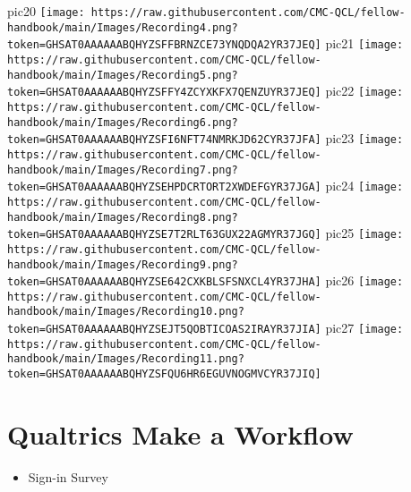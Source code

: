 \documentclass[
]{book}
\providecommand{\tightlist}{%
  \setlength{\itemsep}{0pt}\setlength{\parskip}{0pt}}
\begin{document}
pic20
\texttt{[image: https://raw.githubusercontent.com/CMC-QCL/fellow-handbook/main/Images/Recording4.png?token=GHSAT0AAAAAABQHYZSFFBRNZCE73YNQDQA2YR37JEQ]}
pic21
\texttt{[image: https://raw.githubusercontent.com/CMC-QCL/fellow-handbook/main/Images/Recording5.png?token=GHSAT0AAAAAABQHYZSFFY4ZCYXKFX7QENZUYR37JEQ]}
pic22
\texttt{[image: https://raw.githubusercontent.com/CMC-QCL/fellow-handbook/main/Images/Recording6.png?token=GHSAT0AAAAAABQHYZSFI6NFT74NMRKJD62CYR37JFA]}
pic23
\texttt{[image: https://raw.githubusercontent.com/CMC-QCL/fellow-handbook/main/Images/Recording7.png?token=GHSAT0AAAAAABQHYZSEHPDCRTORT2XWDEFGYR37JGA]}
pic24
\texttt{[image: https://raw.githubusercontent.com/CMC-QCL/fellow-handbook/main/Images/Recording8.png?token=GHSAT0AAAAAABQHYZSE7T2RLT63GUX22AGMYR37JGQ]}
pic25
\texttt{[image: https://raw.githubusercontent.com/CMC-QCL/fellow-handbook/main/Images/Recording9.png?token=GHSAT0AAAAAABQHYZSE642CXKBLSFSNXCL4YR37JHA]}
pic26
\texttt{[image: https://raw.githubusercontent.com/CMC-QCL/fellow-handbook/main/Images/Recording10.png?token=GHSAT0AAAAAABQHYZSEJT5QOBTICOAS2IRAYR37JIA]}
pic27
\texttt{[image: https://raw.githubusercontent.com/CMC-QCL/fellow-handbook/main/Images/Recording11.png?token=GHSAT0AAAAAABQHYZSFQU6HR6EGUVNOGMVCYR37JIQ]}

\hypertarget{qualtrics-make-a-workflow}{%
\section{Qualtrics Make a Workflow}\label{qualtrics-make-a-workflow}}

\begin{itemize}
\tightlist
\item
  Sign-in Survey
\end{itemize}
\end{document}
